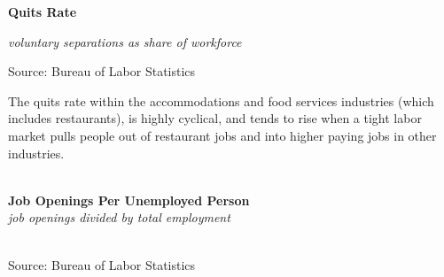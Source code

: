 \documentclass{report}
\makeatletter
\newcommand{\tbllink}[1]{\href{https://raw.githubusercontent.com/bdecon/US-chartbook/master/chartbook/data/#1}{\faTable}}
\newcommand*\short[1]{\expandafter\@gobbletwo\number\numexpr#1\relax}
\newcommand{\stdnode}[3]{\node[below, align=left, shift=({#1,#2})]{#3};}
\newcommand{\dateaxisticks}{
		date coordinates in=x, axis line style={draw=none},
		xmax={2020-08-10},
		max space between ticks=40,	    
		xtick={{1990-01-01}, {1992-01-01}, {1994-01-01}, 
			{1996-01-01}, {1998-01-01}, {2000-01-01}, 
			{2002-01-01}, {2004-01-01}, {2006-01-01},
			{2008-01-01}, {2010-01-01}, {2012-01-01}, {2014-01-01},
		    {2016-01-01}, {2018-01-01}, {2020-01-01}},
		minor xtick={{1989-01-01}, {1991-01-01}, {1993-01-01},
			{1995-01-01}, {1997-01-01}, {1999-01-01}, 
			{2001-01-01}, {2003-01-01}, {2005-01-01}, {2007-01-01},
		    {2009-01-01}, {2011-01-01}, {2013-01-01}, {2015-01-01},
		    {2017-01-01}, {2019-01-01}},
		enlarge y limits={0.06}, enlarge x limits={0.01},
		}
\newcommand{\shdateaxisticks}{
		date coordinates in=x, axis line style={draw=none},
		xmax={2021-01-01},
		max space between ticks=40,	    
		xtick={{1990-01-01}, {1995-01-01}, {2000-01-01}, 
			{2005-01-01}, {2010-01-01}, {2015-01-01}, {2020-01-01}},
		minor xtick={},
		enlarge y limits={0.06}, enlarge x limits={0.01},
		}
\newcommand{\bbar}[2]{extra #1 ticks = {{#2}}, extra #1 tick labels = ,
		extra #1 tick style = {grid=major, grid style={thick, black!25}},}
\newcommand{\stdline}[4]{\addplot[very thick, no markers, color=#1] 
		table [x=#2, y=#3, col sep=comma] {#4};	}
\newcommand{\rebars}{
		\fill[color=black!10] (axis cs:{2007-12-01},\pgfkeysvalueof{/pgfplots/ymin}) rectangle 
			(axis cs:{2009-07-01}, \pgfkeysvalueof{/pgfplots/ymax});
		\fill[color=black!10] (axis cs:{2001-03-01},\pgfkeysvalueof{/pgfplots/ymin}) rectangle 
			(axis cs:{2001-11-01}, \pgfkeysvalueof{/pgfplots/ymax});
		\fill[color=black!10] (axis cs:{2020-02-01},\pgfkeysvalueof{/pgfplots/ymin}) rectangle 
			(axis cs:{2020-09-01}, \pgfkeysvalueof{/pgfplots/ymax});}
\makeatother
\begin{document}
{{{{{{{{{\begin{minipage}{0.38\textwidth}
\normalsize \textbf{Quits Rate}

\footnotesize{\textit{voluntary separations as share of workforce}}

\hspace*{-2mm} 

\footnotesize{Source: Bureau of Labor Statistics} \hfill \tbllink{quits.csv}

\end{minipage}
\hspace{9mm}
\begin{minipage}{0.31\textwidth}
\small The quits rate within the accommodations and food services industries (which includes restaurants), is highly cyclical, and tends to rise when a tight labor market pulls people out of restaurant jobs and into higher paying jobs in other industries. 
\end{minipage}

\newpage

\begin{minipage}{0.76\textwidth}

\small \\

\noindent \normalsize \textbf{Job Openings Per Unemployed Person}\\
\footnotesize{\textit{job openings divided by total employment}}\\
\noindent \hspace*{-2mm} \\
\footnotesize{Source: Bureau of Labor Statistics} \hfill \tbllink{unjo.csv}
\end{minipage}

}}}}}}}}}
\end{document}

